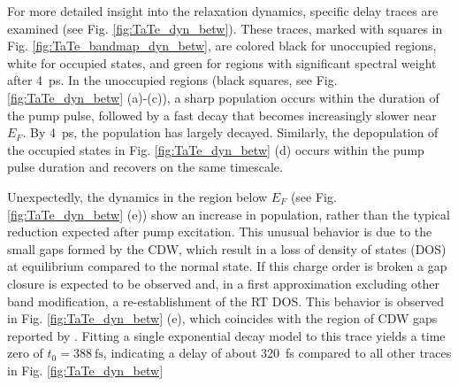 For more detailed insight into the relaxation dynamics, specific delay traces are examined (see Fig. \ref{fig:TaTe_dyn_betw}).
These traces, marked with squares in Fig. \ref{fig:TaTe_bandmap_dyn_betw}, are colored black for unoccupied regions, white for occupied states, and green for regions with significant spectral weight after \qty{4}{\pico\second}.
In the unoccupied regions (black squares, see Fig. \ref{fig:TaTe_dyn_betw} (a)-(c)), a sharp population occurs within the duration of the pump pulse, followed by a fast decay that becomes increasingly slower near $E_F$.
By \qty{4}{\pico\second}, the population has largely decayed.
Similarly, the depopulation of the occupied states in Fig. \ref{fig:TaTe_dyn_betw} (d) occurs within the pump pulse duration and recovers on the same timescale.

Unexpectedly, the dynamics in the region below $E_F$ (see Fig. \ref{fig:TaTe_dyn_betw} (e)) show an increase in population, rather than the typical reduction expected after pump excitation.
This unusual behavior is due to the small gaps formed by the CDW, which result in a loss of density of states (DOS) at equilibrium compared to the normal state.
If this charge order is broken a gap closure is expected to be observed and, in a first approximation excluding other band modification, a re-establishment of the RT DOS.
This behavior is observed in Fig. \ref{fig:TaTe_dyn_betw} (e), which coincides with the region of CDW gaps reported by \cite{lin_evidence_2022}.
Fitting a single exponential decay model to this trace yields a time zero of $t_0=\qty{388}{\femto\second}$, indicating a delay of about \qty{320}{\femto\second} compared to all other traces in Fig. \ref{fig:TaTe_dyn_betw}

